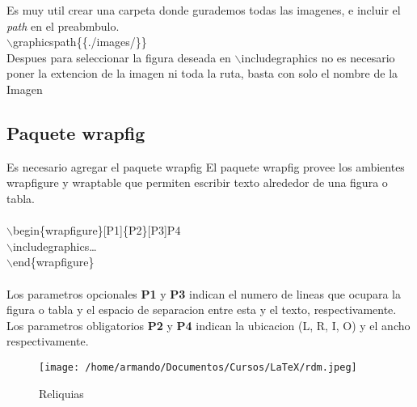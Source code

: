 \documentclass{article}
\begin{document}
	Es muy util crear una carpeta donde gurademos todas las imagenes, e incluir el \textit{path} en el preabmbulo.\\\textcolor{myOrange}{$\backslash$graphicspath}\{\{./images/\}\}\\ Despues para seleccionar la figura deseada en \textcolor{myGreen}{$\backslash$includegraphics} no es necesario poner la extencion de la imagen ni toda la ruta, basta con solo el nombre de la Imagen

	\subsection{Paquete wrapfig}
	Es necesario agregar el paquete wrapfig
	El paquete \textcolor{myGreen}{wrapfig} provee los ambientes \textcolor{myGreen}{wrapfigure} y \textcolor{myGreen}{wraptable} que permiten escribir texto alrededor de una figura o tabla.
	\\\\\textcolor{myGreen}{$\backslash$begin}\{wrapfigure\}[P1]\{P2\}[P3]{P4}\\\textcolor{myGreen}{$\backslash$includegraphics}\dots\\\textcolor{myGreen}{$\backslash$end}\{wrapfigure\}\\\\
	Los parametros opcionales \textbf{P1} y \textbf{P3} indican el numero de lineas que ocupara la figura o tabla y el espacio de separacion entre esta y el texto, respectivamente.\\Los parametros obligatorios \textbf{P2} y \textbf{P4} indican la ubicacion (L, R, I, O) y el ancho respectivamente.
	\begin{wrapfigure}[13]{l}[5mm]{0.35\textwidth}
	\centering
	\texttt{[image: /home/armando/Documentos/Cursos/LaTeX/rdm.jpeg]}
	\caption{Reliquias}
	\end{wrapfigure}
	\lipsum[1-2] 
\end{document}

